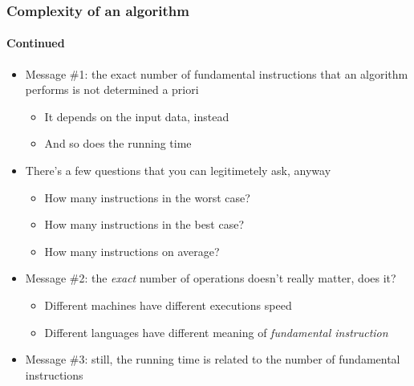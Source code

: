 \documentclass[9pt]{beamer}
\begin{document}
\begin{frame}
  \frametitle{Complexity of an algorithm}
  \framesubtitle{Continued}
  \begin{itemize}
  \item Message \#1: \alert{the exact number of fundamental instructions that an
    algorithm performs is not determined a priori}
    \begin{itemize}
    \item It depends on the input data, instead
    \item And so does the running time
    \end{itemize}
  \item There's a few questions that you can legitimetely ask, anyway
    \begin{itemize}
    \item How many instructions in the \alert{worst case}?
    \item How many instructions in the \alert{best case}?
    \item How many instructions on \alert{average}?
    \end{itemize}
  \item Message \#2: \alert{the \emph{exact} number of operations doesn't really
    matter}, does it?
    \begin{itemize}
    \item Different machines have different executions speed
    \item Different languages have different meaning of
      \emph{fundamental instruction}
    \end{itemize}
  \item Message \#3: still, \alert{the running time is related to the number
  of fundamental instructions}
  \end{itemize}
\end{frame}
\end{document}
